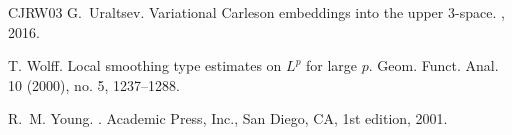 \documentclass[12pt,leqno]{amsart}
\theoremstyle{plain}
\numberwithin{equation}{section}
\begin{document}
\begin{thebibliography}{CJRW03}
	G.~Uraltsev.
	\newblock Variational {C}arleson embeddings into the upper 3-space.
	, 2016.
	
	T. Wolff.
	\newblock Local smoothing type estimates on $L^p$ for large $p$.
	\newblock Geom. Funct. Anal. 10 (2000), no. 5, 1237--1288. 
	
	R.~M. Young.
	.
	\newblock Academic Press, Inc., San Diego, CA, 1st edition, 2001.
	
\end{thebibliography}
\end{document}
